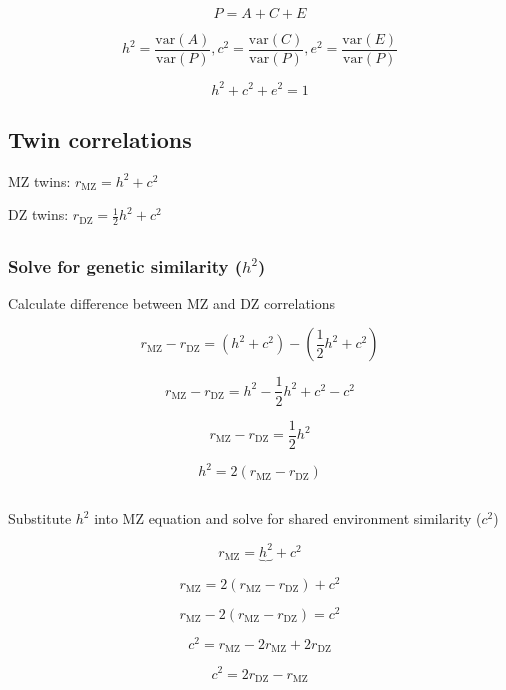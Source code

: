 \documentclass[
  letterpaper,
  DIV=11,
  numbers=noendperiod]{scrartcl}
\begin{document}
\[P = A + C + E\]

\[h^2 = \frac{\mathrm{var}(A)}{\mathrm{var}(P)}, c^2 = \frac{\mathrm{var}(C)}{\mathrm{var}(P)}, e^2 = \frac{\mathrm{var}(E)}{\mathrm{var}(P)}\]

\[h^2 + c^2 + e^2 = 1\]

\subsection{Twin correlations}\label{twin-correlations}

MZ twins: \(r_\mathrm{MZ} = h^2 + c^2\)

DZ twins: \(r_\mathrm{DZ} = \frac{1}{2}h^2 + c^2\)

\subsection{}\label{section-8}

\subsubsection{\texorpdfstring{Solve for genetic similarity
(\(h^2\))}{Solve for genetic similarity (h\^{}2)}}\label{solve-for-genetic-similarity-h2}

Calculate difference between MZ and DZ correlations

\[
r_\mathrm{MZ} - r_\mathrm{DZ} = (h^2 + c^2) - (\frac{1}{2}h^2 + c^2)
\]

\[
r_\mathrm{MZ} - r_\mathrm{DZ} = h^2 - \frac{1}{2}h^2 + c^2 - c^2
\]

\[
r_\mathrm{MZ} - r_\mathrm{DZ} = \frac{1}{2}h^2
\]

\[
h^2 = 2(r_\mathrm{MZ} - r_\mathrm{DZ})
\]

\subsection{}\label{section-9}

Substitute \(h^2\) into MZ equation and solve for shared environment
similarity (\(c^2\))

\[
r_\mathrm{MZ} = \underbrace{h^2} + c^2
\]

\[
r_\mathrm{MZ} = 2(r_\mathrm{MZ} - r_\mathrm{DZ}) + c^2
\]

\[
r_\mathrm{MZ} - 2(r_\mathrm{MZ} - r_\mathrm{DZ}) = c^2
\]

\[
c^2 = r_\mathrm{MZ} - 2r_\mathrm{MZ} + 2r_\mathrm{DZ}
\]

\[
c^2 = 2r_\mathrm{DZ} - r_\mathrm{MZ}
\]
\end{document}
